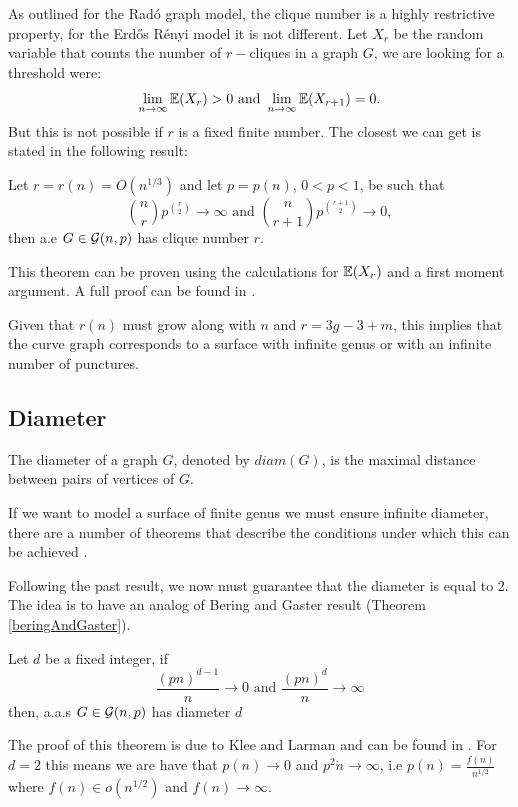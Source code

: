 As outlined for the Radó graph model, the clique number is a highly restrictive property, for the Erdős Rényi model it is not different. Let $X_r$ be the random variable that counts the number of $r-$cliques in a graph $G$, we are looking for a threshold were:
$$\lim\limits_{n \to \infty}\mathbb{E}(X_{r}) > 0 \text{ and } \lim\limits_{n \to \infty}\mathbb{E} (X_{r+1}) = 0.$$
But this is not possible if $r$ is a fixed finite number. The closest we can get is stated in the following result:
\begin{theorem}\label{cliqueNumberER}
Let $r = r(n) = O(n^{1/3})$ and let $p=p(n)$, $0<p<1$, be such that
$$\binom{n}{r} p^{\binom{r}{2}} \to \infty \text{ and } \binom{n}{r+1} p^{\binom{r+1}{2}} \to 0,$$
then a.e $G\in\mathcal{G}(n,p)$ has clique number $r$.
\end{theorem}

 This theorem can be proven using the calculations for $\mathbb{E}(X_{r})$ and a first moment argument. A full proof can be found in \cite[Bollobás, p.~290]{Bollobas}.

Given that $r(n)$ must grow along with $n$ and $r=3g-3+m$, this implies that the curve graph corresponds to a surface with infinite genus or with an infinite number of punctures.

\subsection{Diameter}

The diameter of a graph $G$, denoted by $diam(G)$, is the maximal distance between pairs of vertices of $G$.

If we want to model a surface of finite genus we must ensure infinite diameter, there are a number of theorems that describe the conditions under which this can be achieved \cite[Bollobás, p.~259]{Bollobas}.

Following the past result, we now must guarantee that the diameter is equal to 2. The idea is to have an analog of Bering and Gaster result (Theorem \ref{beringAndGaster}).

\begin{theorem}\label{diameterER}
Let $d$ be a fixed integer, if 
$$\frac{(pn)^{d-1}}{n} \to 0 \text{ and } \frac{(pn)^{d}}{n} \to \infty $$
then, a.a.s $G\in\mathcal{G}(n,p)$ has diameter $d$
\end{theorem}

The proof of this theorem is due to Klee and Larman and can be found in \cite[Klee, Larman 81]{diameters}. For $d=2$ this means we are have that $p(n)\to 0$ and $p^2 \dot n\to \infty$, i.e $p(n)= \frac{f(n)}{n^{1/2}}$ where $f(n)\in o(n^{1/2})$ and $f(n)\to \infty$.

